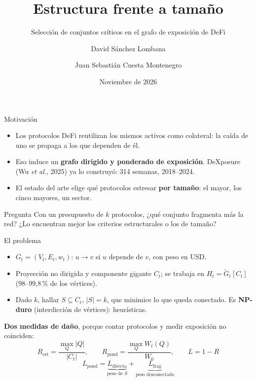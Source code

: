 \documentclass[aspectratio=169,11pt]{beamer}
\title{Estructura frente a tamaño}
\subtitle{Selección de conjuntos críticos en el grafo de exposición de DeFi}
\author{David Sánchez Lombana \and Juan Sebastián Cuesta Montenegro}
\institute{Teoría de Grafos 2026-II · Prof.\ Daniel Bojacá\\Universidad del Rosario}
\date{Noviembre de 2026}
\newcommand{\clave}[1]{{\color{acento}\bfseries #1}}
\begin{document}
\begin{frame}
\titlepage
\end{frame}

\begin{frame}{Motivación}
\begin{itemize}
\item Los protocolos DeFi reutilizan los mismos activos como colateral: la
      caída de uno se propaga a los que dependen de él.
\item Eso induce un \clave{grafo dirigido y ponderado de exposición}. DeXposure
      (Wu \emph{et al.}, 2025) ya lo construyó: 314 semanas, 2018--2024.
\item El estado del arte elige qué protocolos estresar \clave{por tamaño}: el
      mayor, los cinco mayores, un sector.
\end{itemize}
\vspace{1em}
\begin{block}{Pregunta}
Con un presupuesto de $k$ protocolos, ¿qué conjunto fragmenta más la red? ¿Lo
encuentran mejor los criterios estructurales o los de tamaño?
\end{block}
\end{frame}

\begin{frame}{El problema}
\begin{itemize}
\item $G_t=(V_t,E_t,w_t)$: $u\to v$ si $u$ depende de $v$, con peso en USD.
\item Proyección no dirigida y componente gigante $C_t$; se trabaja en
      $H_t=\tilde G_t[C_t]$ (98--99{,}8\,\% de los vértices).
\item Dado $k$, hallar $S\subseteq C_t$, $|S|=k$, que minimice lo que queda
      conectado. Es \clave{NP-duro} (interdicción de vértices): heurísticas.
\end{itemize}
\vspace{0.6em}
\textbf{Dos medidas de daño}, porque contar protocolos y medir exposición no
coinciden:
\[
R_{\mathrm{est}}=\frac{\max_Q|Q|}{|C_t|},\qquad
R_{\mathrm{pond}}=\frac{\max_Q W_t(Q)}{W_0},\qquad L=1-R
\]
\[
L_{\mathrm{pond}}=\underbrace{L_{\mathrm{directa}}}_{\text{peso de }S}
+\underbrace{L_{\mathrm{frag}}}_{\text{peso desconectado}}
\]
\end{frame}
\end{document}
